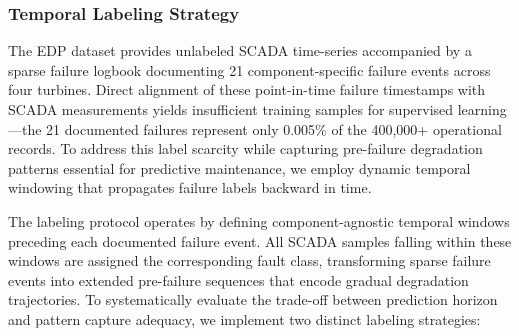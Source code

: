 \documentclass[12pt]{article}
\begin{document}



\subsubsection{Temporal Labeling Strategy}
\label{subsubsec:temporal_labeling}

The EDP dataset provides unlabeled SCADA time-series accompanied by a sparse failure logbook documenting 21 component-specific failure events across four turbines. Direct alignment of these point-in-time failure timestamps with SCADA measurements yields insufficient training samples for supervised learning—the 21 documented failures represent only 0.005\% of the 400,000+ operational records. To address this label scarcity while capturing pre-failure degradation patterns essential for predictive maintenance, we employ dynamic temporal windowing that propagates failure labels backward in time.

The labeling protocol operates by defining component-agnostic temporal windows preceding each documented failure event. All SCADA samples falling within these windows are assigned the corresponding fault class, transforming sparse failure events into extended pre-failure sequences that encode gradual degradation trajectories. To systematically evaluate the trade-off between prediction horizon and pattern capture adequacy, we implement two distinct labeling strategies:
\end{document}
